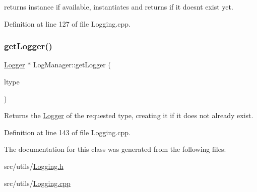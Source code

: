 returns instance if available, instantiates and returns if it doesn\textquotesingle{}t exist yet. 



Definition at line 127 of file Logging.\+cpp.

\mbox{\label{class_world_architect_1_1_log_manager_acd160df28467052ffcb0adac0a5ec40b}} 
\subsubsection{\texorpdfstring{getLogger()}{getLogger()}}
{\footnotesize\ttfamily \mbox{\hyperlink{class_world_architect_1_1_logger}{Logger}} $\ast$ Log\+Manager\+::get\+Logger (\begin{DoxyParamCaption}\item[{\mbox{\hyperlink{namespace_world_architect_adf13e54f2c38346ed9d5013cff07fc8e}{Log\+Type}}}]{ltype }\end{DoxyParamCaption})}



Returns the \mbox{\hyperlink{class_world_architect_1_1_logger}{Logger}} of the requested type, creating it if it does not already exist. 



Definition at line 143 of file Logging.\+cpp.



The documentation for this class was generated from the following files\+:\begin{DoxyCompactItemize}
\item 
src/utils/\mbox{\hyperlink{_logging_8h}{Logging.\+h}}\item 
src/utils/\mbox{\hyperlink{_logging_8cpp}{Logging.\+cpp}}\end{DoxyCompactItemize}

